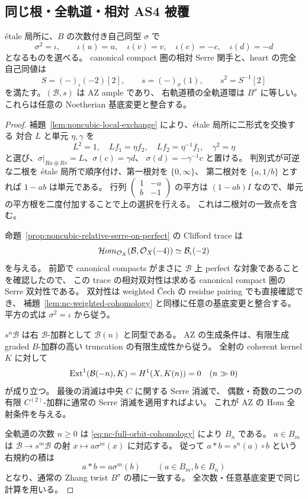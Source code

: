 \subsection{同じ根・全軌道・相対 AS4 被覆}

\begin{proposition}\label{prop:nc-root-ample-orbit}
étale 局所に、$B$ の次数付き自己同型 $\sigma$ で
\[
 \sigma^2=\iota,\qquad
 \iota(u)=u,\quad\iota(v)=v,\quad\iota(c)=-c,\quad\iota(d)=-d
\]
となるものを選べる。
canonical compact 圏の相対 Serre 関手と、heart の完全自己同値は
\[
 S=(-)_\iota(-2)[2],\qquad s=(-)_\sigma(1),\qquad s^2=S^{-1}[2]
\]
を満たす。$(\mathcal B,s)$ は AZ ample であり、
右軌道積の全軌道環は $B^\sigma$ に等しい。
これらは任意の Noetherian 基底変更と整合する。
\end{proposition}

\begin{proof}
補題~\ref{lem:noncubic-local-exchange} により、étale 局所に二形式を交換する
対合 $L$ と単元 $\eta,\gamma$ を
\[
 L^2=1,\quad Lf_1=\eta f_2,\quad Lf_2=\eta^{-1}f_1,\quad\gamma^2=\eta
\]
と選び、$\sigma|_{Ru\oplus Rv}=L$、$\sigma(c)=\gamma d$、
$\sigma(d)=-\gamma^{-1}c$ と置ける。
判別式が可逆な二根を étale 局所で順序付け、第一根対を $\{0,\infty\}$、
第二根対を $\{a,1/b\}$ とすれば
$1-ab$ は単元である。
行列 $\left(\begin{smallmatrix}1&-a\\b&-1\end{smallmatrix}\right)$ の平方は
$(1-ab)I$ なので、単元の平方根を二度付加することで上の選択を行える。
これは二根対の一致点を含む。

命題~\ref{prop:noncubic-relative-serre-on-perfect} の Clifford trace は
\[
 \mathcal Hom_{\mathcal O_X}(\mathcal B,\mathcal O_X(-4))
 \simeq\mathcal B_\iota(-2)
\]
を与える。
前節で canonical compacts がまさに $\mathcal B$ 上 perfect な対象であることを確認したので、
この trace の相対双対性は求める canonical compact 圏の Serre 双対性である。
双対性は weighted \v{C}ech の residue pairing でも直接確認でき、
補題~\ref{lem:nc-weighted-cohomology} と同様に任意の基底変更と整合する。
平方の式は $\sigma^2=\iota$ から従う。

$s^n\mathcal B$ は右 $\mathcal B$-加群として $\mathcal B(n)$ と同型である。
AZ の生成条件は、有限生成 graded $B$-加群の高い truncation の有限生成性から従う。
全射の coherent kernel $K$ に対して
\[
 \operatorname{Ext}^1(\mathcal B(-n),K)=H^1(X,K(n))=0\quad(n\gg0)
\]
が成り立つ。
最後の消滅は中央 $C$ に関する Serre 消滅で、
偶数・奇数の二つの有限 $C^{(2)}$-加群に通常の Serre 消滅を適用すればよい。
これが AZ の Hom 全射条件を与える。

全軌道の次数 $n\ge0$ は \eqref{eq:nc-full-orbit-cohomology} により $B_n$ である。
$a\in B_m$ は $\mathcal B\to s^m\mathcal B$ の射
$x\mapsto a\sigma^m(x)$ に対応する。
従って $a*b=s^n(a)\circ b$ という右規約の積は
\[
 a*b=a\sigma^m(b)\qquad(a\in B_m,b\in B_n)
\]
となり、通常の Zhang twist $B^\sigma$ の積に一致する。
全次数・任意基底変更で同じ計算を用いる。
\end{proof}


